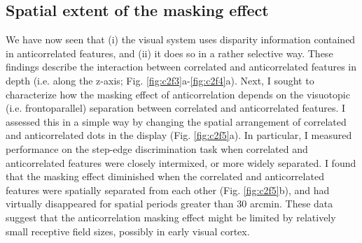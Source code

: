 \subsection{Spatial extent of the masking effect}
We have now seen that (i) the visual system uses disparity information contained in anticorrelated features, and (ii) it does so in a rather selective way. These findings describe the interaction between correlated and anticorrelated features in depth (i.e. along the z-axis; Fig. \ref{fig:c2f3}a-\ref{fig:c2f4}a). Next, I sought to characterize how the masking effect of anticorrelation depends on the visuotopic (i.e. frontoparallel) separation between correlated and anticorrelated features. I assessed this in a simple way by changing the spatial arrangement of correlated and anticorrelated dots in the display (Fig. \ref{fig:c2f5}a). In particular, I measured performance on the step-edge discrimination task when correlated and anticorrelated features were closely intermixed, or more widely separated. I found that the masking effect diminished when the correlated and anticorrelated features were spatially separated from each other (Fig. \ref{fig:c2f5}b), and had virtually disappeared for spatial periods greater than 30 arcmin. These data suggest that the anticorrelation masking effect might be limited by relatively small receptive field sizes, possibly in early visual cortex.


